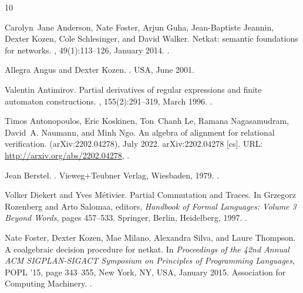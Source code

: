 \documentclass[11pt,a4paper]{amsart}
\theoremstyle{definition}
\begin{document}
\begin{thebibliography}{10}

Carolyn~Jane Anderson, Nate Foster, Arjun Guha, Jean-Baptiste Jeannin, Dexter Kozen, Cole Schlesinger, and David Walker.
\newblock Netkat: semantic foundations for networks.
, 49(1):113–126, January 2014.
\newblock \href {https://doi.org/10.1145/2578855.2535862} {}.

Allegra Angus and Dexter Kozen.
.
\newblock USA, June 2001.

Valentin Antimirov.
\newblock Partial derivatives of regular expressions and finite automaton constructions.
, 155(2):291--319, March 1996.
\newblock \href {https://doi.org/10.1016/0304-3975(95)00182-4} {}.

Timos Antonopoulos, Eric Koskinen, Ton~Chanh Le, Ramana Nagasamudram, David~A. Naumann, and Minh Ngo.
\newblock An algebra of alignment for relational verification.
\newblock (arXiv:2202.04278), July 2022.
\newblock arXiv:2202.04278 [cs].
\newblock URL: \url{http://arxiv.org/abs/2202.04278}, \href {https://doi.org/10.48550/arXiv.2202.04278} {}.

Jean Berstel.
.
\newblock Vieweg+Teubner Verlag, Wiesbaden, 1979.
\newblock \href {https://doi.org/10.1007/978-3-663-09367-1} {}.

Volker Diekert and Yves M{\'e}tivier.
\newblock Partial {{Commutation}} and {{Traces}}.
\newblock In Grzegorz Rozenberg and Arto Salomaa, editors, {\em Handbook of {{Formal Languages}}: {{Volume}} 3 {{Beyond Words}}}, pages 457--533. Springer, Berlin, Heidelberg, 1997.
\newblock \href {https://doi.org/10.1007/978-3-642-59126-6_8} {}.

Nate Foster, Dexter Kozen, Mae Milano, Alexandra Silva, and Laure Thompson.
\newblock A coalgebraic decision procedure for netkat.
\newblock In {\em Proceedings of the 42nd Annual ACM SIGPLAN-SIGACT Symposium on Principles of Programming Languages}, POPL ’15, page 343–355, New York, NY, USA, January 2015. Association for Computing Machinery.
\newblock \href {https://doi.org/10.1145/2676726.2677011} {}.


\end{thebibliography}
\end{document}
